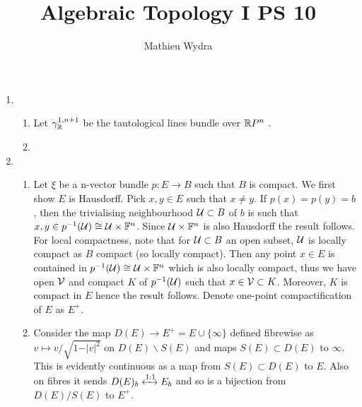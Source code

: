 \documentclass[10pt,a4paper]{article}
\title{Algebraic Topology I PS 10}
\author{Mathieu Wydra}
\date{}
\begin{document}
\maketitle
\begin{enumerate}
\item \begin{enumerate}
\item Let $\gamma^{1,n+1}_{\mathbb{R}}$ be the tautological lines bundle over $\mathbb{R} P^n$ .
\item 
\end{enumerate}
\item \begin{enumerate}
\item Let $\xi$ be a n-vector bundle $p:E\to B$ such that $B$ is compact. We first show $E$ is Hausdorff. Pick $x,y\in E$ such that $x\neq y$. If $p(x) = p(y) = b$, then the trivialising neighbourhood $\mathcal{U}\subset B$ of $b$ is such that $x,y\in p^{-1}(\mathcal{U})\cong \mathcal{U}\times \mathbb{F}^n$. Since $\mathcal{U}\times \mathbb{F}^n$ is also Hausdorff the result follows. For local compactness, note that for $\mathcal{U}\subset B$ an open subset, $\mathcal{U}$ is locally compact as $B$ compact (so locally compact). Then any point $x\in E$ is contained in $p^{-1}(\mathcal{U})\cong \mathcal{U}\times \mathbb{F}^n$ which is also locally compact, thus we have open $\mathcal{V}$ and compact $K$ of $p^{-1}(\mathcal{U})$ such that $x\in \mathcal{V}\subset K$. Moreover, $K$ is compact in $E$ hence the result follows. Denote one-point compactification of $E$ as $E^+$.
\item Consider the map $D(E)\to E^+ = E\cup \{\infty\}$ defined fibrewise as $v \mapsto v/ \sqrt{1-\vert v\vert^2}$ on $D(E)\backslash S(E)$ and maps $S(E)\subset D(E)$ to $\infty$. This is evidently continuous as a map from $S(E)\subset D(E)$ to $E$. Also on fibres it sends $D(E)_b\xleftrightarrow{1:1} E_b$ and so is a bijection from $D(E)/S(E)$ to $E^+$.
\end{enumerate}
\end{enumerate}
\end{document}

